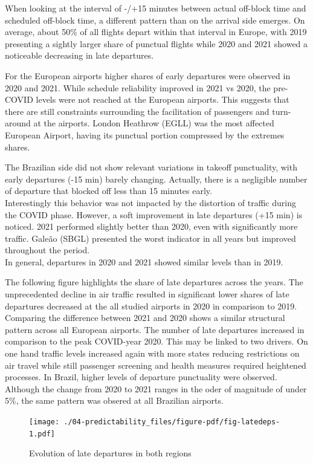 \documentclass[
  a4paper,
  DIV=11,
  numbers=noendperiod]{scrreprt}
\begin{document}
When looking at the interval of -/+15 minutes between actual off-block
time and scheduled off-block time, a different pattern than on the
arrival side emerges. On average, about 50\% of all flights depart
within that interval in Europe, with 2019 presenting a sightly larger
share of punctual flights while 2020 and 2021 showed a noticeable
decreasing in late departures.

For the European airports higher shares of early departures were
observed in 2020 and 2021. While schedule reliability improved in 2021
vs 2020, the pre-COVID levels were not reached at the European airports.
This suggests that there are still constraints surrounding the
facilitation of passengers and turn-around at the airports. London
Heathrow (EGLL) was the most affected European Airport, having its
punctual portion compressed by the extremes shares.

The Brazilian side did not show relevant variations in takeoff
punctuality, with early departures (-15 min) barely changing. Actually,
there is a negligible number of departure that blocked off less than 15
minutes early.\\
Interestingly this behavior was not impacted by the distortion of
traffic during the COVID phase. However, a soft improvement in late
departures (+15 min) is noticed. 2021 performed slightly better than
2020, even with significantly more traffic. Galeão (SBGL) presented the
worst indicator in all years but improved throughout the period.\\
In general, departures in 2020 and 2021 showed similar levels than in
2019.

The following figure highlights the share of late departures across the
years. The unprecedented decline in air traffic resulted in significant
lower shares of late departures decreased at the all studied airports in
2020 in comparison to 2019. Comparing the difference between 2021 and
2020 shows a similar structural pattern across all European airports.
The number of late departures increased in comparison to the peak
COVID-year 2020. This may be linked to two drivers. On one hand traffic
levels increased again with more states reducing restrictions on air
travel while still passenger screening and health measures required
heightened processes. In Brazil, higher levels of departure punctuality
were observed. Although the change from 2020 to 2021 ranges in the oder
of magnitude of under 5\%, the same pattern was obsered at all Brazilian
airports.

\begin{figure}[h]

{\centering \texttt{[image: ./04-predictability\_files/figure-pdf/fig-latedeps-1.pdf]}

}

\caption{\label{fig-latedeps}Evolution of late departures in both
regions}

\end{figure}
\end{document}
